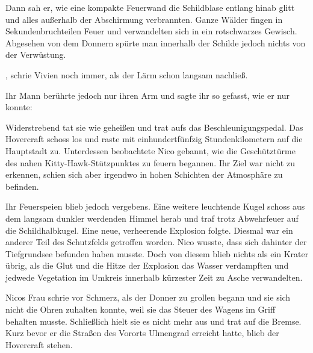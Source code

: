 \par

Dann sah er, wie eine kompakte Feuerwand die Schildblase entlang hinab glitt und alles außerhalb der Abschirmung verbrannten. Ganze Wälder fingen in Sekundenbruchteilen Feuer und verwandelten sich in ein rotschwarzes Gewisch. Abgesehen von dem Donnern spürte man innerhalb der Schilde jedoch nichts von der Verwüstung.

\par

, schrie Vivien noch immer, als der Lärm schon langsam nachließ.

\par

Ihr Mann berührte jedoch nur ihren Arm und sagte ihr so gefasst, wie er nur konnte: 

\par

Widerstrebend tat sie wie geheißen und trat aufs das Beschleunigungspedal. Das Hovercraft schoss los und raste mit einhundertfünfzig Stundenkilometern auf die Hauptstadt zu. Unterdessen beobachtete Nico gebannt, wie die Geschütztürme des nahen Kitty-Hawk-Stützpunktes zu feuern begannen. Ihr Ziel war nicht zu erkennen, schien sich aber irgendwo in hohen Schichten der Atmosphäre zu befinden.

\par

Ihr Feuerspeien blieb jedoch vergebens. Eine weitere leuchtende Kugel schoss aus dem langsam dunkler werdenden Himmel herab und traf trotz Abwehrfeuer auf die Schildhalbkugel. Eine neue, verheerende Explosion folgte. Diesmal war ein anderer Teil des Schutzfelds getroffen worden. Nico wusste, dass sich dahinter der Tiefgrundsee befunden haben musste. Doch von diesem blieb nichts als ein Krater übrig, als die Glut und die Hitze der Explosion das Wasser verdampften und jedwede Vegetation im Umkreis innerhalb kürzester Zeit zu Asche verwandelten.

\par

Nicos Frau schrie vor Schmerz, als der Donner zu grollen begann und sie sich nicht die Ohren zuhalten konnte, weil sie das Steuer des Wagens im Griff behalten musste. Schließlich hielt sie es nicht mehr aus und trat auf die Bremse. Kurz bevor er die Straßen des Vororts Ulmengrad erreicht hatte, blieb der Hovercraft stehen.

\par

